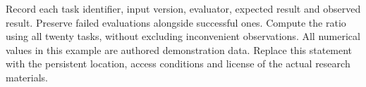 \makeappendices
{}
Record each task identifier, input version, evaluator, expected result and observed result. Preserve failed evaluations alongside successful ones. Compute the ratio using all twenty tasks, without excluding inconvenient observations.
All numerical values in this example are authored demonstration data. Replace this statement with the persistent location, access conditions and license of the actual research materials.
\makeregisters
\makedeclaration

